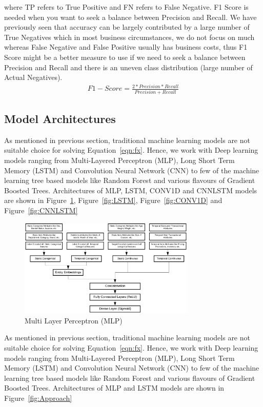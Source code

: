 where TP refers to True Positive and FN refers to False Negative.
F1 Score is needed when you want to seek a balance between Precision and Recall.
We have previously seen that accuracy can be largely contributed by a large number of True Negatives which 
in most business circumstances, we do not focus on much whereas False Negative and False Positive usually has 
business costs, thus F1 Score might be a better measure to use if we need to seek a balance
between Precision and Recall and there is an uneven class distribution (large number of Actual Negatives).
  \begin{equation}
      \begin{array}{l}
        F1-Score = \frac{2 * Precision * Recall} {Precision + Recall}
      \end{array}
    \label{eqn:F1}
  \end{equation}

\subsection{Model Architectures}
As mentioned in previous section, traditional machine learning models are not suitable choice for solving Equation~\ref{eqn:fx}. 
Hence, we work with Deep learning models ranging from Multi-Layered Perceptron (MLP), Long Short 
Term Memory (LSTM) and Convolution Neural Network (CNN) to few of the machine learning tree based models like Random 
Forest and various flavours of Gradient Boosted Trees. Architectures of MLP, LSTM, CONV1D and CNNLSTM 
models are shown in Figure~\ref{fig:MLP}, Figure~\ref{fig:LSTM}, Figure~\ref{fig:CONV1D}
and Figure~\ref{fig:CNNLSTM}

  \begin{figure}[t]
    \centering 
    \includegraphics[width=3.3in]{img/MLP.png} 
    \caption{Multi Layer Perceptron (MLP)} 
    \label{fig:MLP} 
  \end{figure}

As mentioned in previous section, traditional machine learning models are not suitable choice for solving Equation~\ref{eqn:fx}. 
Hence, we work with Deep learning models ranging from Multi-Layered Perceptron (MLP), Long Short 
Term Memory (LSTM) and Convolution Neural Network (CNN) to few of the machine learning tree based models like Random 
Forest and various flavours of Gradient Boosted Trees. Architectures of MLP and LSTM models are shown in Figure~\ref{fig:Approach}


